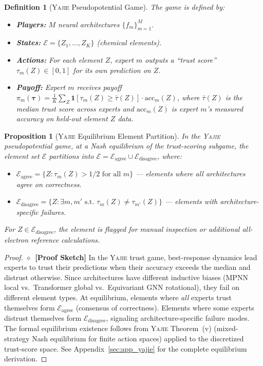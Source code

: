 \documentclass[11pt,a4paper]{article}
\newtheorem{proposition}[theorem]{Proposition}
\newtheorem{definition}[theorem]{Definition}
\theoremstyle{definition}
\newcommand{\rigorSketch}[0]{$\diamond$~\textbf{[Proof Sketch]}}
\newcommand{\Yajie}{\textsc{Yajie}}
\newcommand{\ind}[1]{\mathbf{1}[#1]}
\begin{document}
\begin{definition}[\Yajie{} Pseudopotential Game]\label{def:yajie_game}
The game is defined by:
\begin{itemize}
    \item \textbf{Players:} $M$ neural architectures $\{f_m\}_{m=1}^M$.
    \item \textbf{States:} $\mathcal{E} = \{Z_1, \ldots, Z_K\}$ (chemical elements).
    \item \textbf{Actions:} For each element $Z$, expert $m$ outputs a ``trust score'' $\tau_m(Z) \in [0,1]$ for its own prediction on $Z$.
    \item \textbf{Payoff:} Expert $m$ receives payoff $\pi_m(\boldsymbol{\tau}) = \frac{1}{K}\sum_{Z} \ind{\tau_m(Z) \geq \bar{\tau}(Z)} \cdot \mathrm{acc}_m(Z)$, where $\bar{\tau}(Z)$ is the median trust score across experts and $\mathrm{acc}_m(Z)$ is expert $m$'s measured accuracy on held-out element $Z$ data.
\end{itemize}
\end{definition}

\begin{proposition}[\Yajie{} Equilibrium Element Partition]\label{prop:yajie_partition}
In the \Yajie{} pseudopotential game, at a Nash equilibrium of the trust-scoring subgame, the element set $\mathcal{E}$ partitions into $\mathcal{E} = \mathcal{E}_{\mathrm{agree}} \cup \mathcal{E}_{\mathrm{disagree}}$, where:
\begin{itemize}
    \item $\mathcal{E}_{\mathrm{agree}} = \{Z: \tau_m(Z) > 1/2 \text{ for all } m\}$ — elements where all architectures agree on correctness.
    \item $\mathcal{E}_{\mathrm{disagree}} = \{Z: \exists m, m' \text{ s.t. } \tau_m(Z) \neq \tau_{m'}(Z)\}$ — elements with architecture-specific failures.
\end{itemize}
For $Z \in \mathcal{E}_{\mathrm{disagree}}$, the element is flagged for manual inspection or additional all-electron reference calculations.
\end{proposition}

\begin{proof}\rigorSketch
In the \Yajie{} trust game, best-response dynamics lead experts to trust their predictions when their accuracy exceeds the median and distrust otherwise. Since architectures have different inductive biases (MPNN local vs.\ Transformer global vs.\ Equivariant GNN rotational), they fail on different element types. At equilibrium, elements where \textit{all} experts trust themselves form $\mathcal{E}_{\mathrm{agree}}$ (consensus of correctness). Elements where some experts distrust themselves form $\mathcal{E}_{\mathrm{disagree}}$, signaling architecture-specific failure modes. The formal equilibrium existence follows from \Yajie{} Theorem~(v) (mixed-strategy Nash equilibrium for finite action spaces) applied to the discretized trust-score space. See Appendix~\ref{sec:app_yajie} for the complete equilibrium derivation.
\end{proof}
\end{document}

